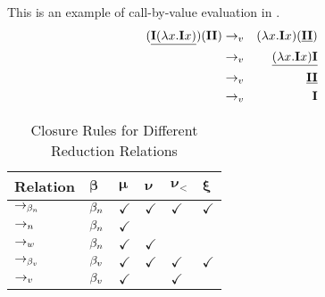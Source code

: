 \begin{example}
	This is an example of call-by-value evaluation in \lan.
	\label{ex:call-by-value}
	\begin{eqnarray*}
		(\underline{\mathbf{I}(\lambda {x}.{\mathbf{I} x})})(\mathbf{I} \mathbf{I}) &\to_v& (\lambda {x}.{\mathbf{I} x}) (\underline{\mathbf{I} \mathbf{I}}) \\
		&\to_v& \underline{(\lambda {x}.{\mathbf{I} x}) \mathbf{I}} \\
		&\to_v& \underline{\mathbf{I} \mathbf{I}} \\
		&\to_v& \mathbf{I} 
	\end{eqnarray*}
\end{example}

\begin{table}[htbp]
\centering
\begin{tabularx}{\linewidth}{|X|XXXXX|}
	\hline
	\textbf{Relation} & $\boldsymbol{\beta}$ & $\boldsymbol{\mu}$ & $\boldsymbol{\nu}$ & $\boldsymbol{\nu_<}$ & $\boldsymbol{\xi}$ \\
		\hline
		$\to_{\beta_n}$ & $\beta_n$ & $\checkmark$ & $\checkmark$ & $\checkmark$ & $\checkmark$ \\
		\hline
		$\to_n$  & $\beta_n$ & $\checkmark$ & 						 &  & \\
		\hline
		$\to_w$  & $\beta_n$ & $\checkmark$ & $\checkmark$ & & \\
		\hline
    $\to_{\beta_v}$ & $\beta_v$ & $\checkmark$ & $\checkmark$ & $\checkmark$ & $\checkmark$ \\
    \hline
    $\to_v$  & $\beta_v$ & $\checkmark$ & 						 & $\checkmark$ & \\
    \hline
\end{tabularx}
\caption{Closure Rules for Different Reduction Relations}
\label{tab2:closure-rules}
\end{table}
